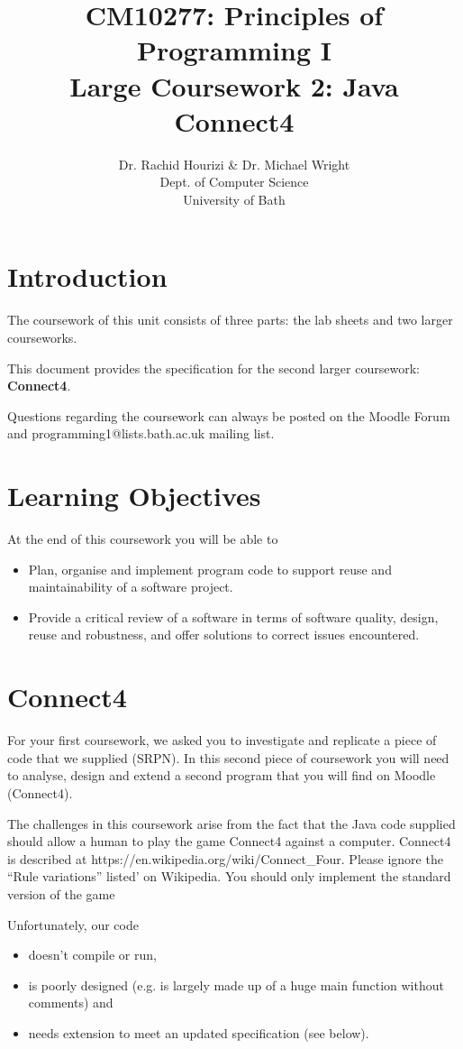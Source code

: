 \documentclass[12pt, oneside]{article}   	%
\title{CM10277: Principles of Programming I \\ Large Coursework 2: Java Connect4}
\author{Dr. Rachid Hourizi \& Dr. Michael Wright \\ Dept. of Computer Science \\ University of Bath}
\date{}							%
\begin{document}
\maketitle
\section{Introduction}
The coursework of this unit consists of three parts: the lab sheets and two larger courseworks. 

This document provides the specification for the second larger coursework: \textbf{Connect4}.

Questions regarding the coursework can always be posted on the Moodle Forum and programming1@lists.bath.ac.uk mailing list.

\section{Learning Objectives}
At the end of this coursework you will be able to 
\begin{itemize}
\item Plan, organise and implement program code to support reuse and maintainability of a software project.
\item Provide a critical review of a software in terms of software quality, design, reuse and robustness, and offer solutions to correct issues encountered.
\end{itemize}

\section{Connect4}
For your first coursework, we asked you to investigate and replicate a piece of code that we 
supplied (SRPN). In this second piece of coursework you will need to analyse, design and extend a second program that you will find on Moodle 
(Connect4).

The challenges in this coursework arise from the fact that the Java code supplied should allow 
a human to play the game Connect4  against a computer. Connect4 is described at 
https://en.wikipedia.org/wiki/Connect\_Four. Please ignore the ``Rule variations'' listed' on Wikipedia. You should only implement the standard version of the game
\bigskip
\bigskip

Unfortunately, our code
\begin{itemize}
\item doesn't compile or run,
\item is poorly designed (e.g. is largely made up of a huge main function without comments) and
\item  needs extension to meet an updated specification (see below).
\end{itemize}
\end{document}
